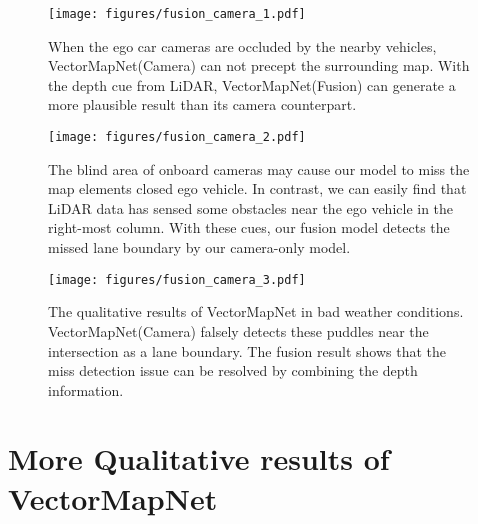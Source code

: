 \documentclass{article}
\theoremstyle{plain}
\theoremstyle{definition}
\theoremstyle{remark}
\begin{document}
\begin{figure}[t]
  \centering
  \texttt{[image: figures/fusion\_camera\_1.pdf]}
  \caption{When the ego car cameras are occluded by the nearby vehicles, VectorMapNet(Camera) can not precept the surrounding map. With the depth cue from LiDAR, VectorMapNet(Fusion) can generate a more plausible result than its camera counterpart.}
  \label{fig:qualitative_Fusion1}
\end{figure}

\begin{figure}[t]
  \centering
  \texttt{[image: figures/fusion\_camera\_2.pdf]}
  \caption{The blind area of onboard cameras may cause our model to miss the map elements closed ego vehicle. In contrast, we can easily find that LiDAR data has sensed some obstacles near the ego vehicle in the right-most column. With these cues, our fusion model detects the missed lane boundary by our camera-only model.}
  \label{fig:qualitative_Fusion2}
\end{figure}

\begin{figure}[t]
  \centering
  \texttt{[image: figures/fusion\_camera\_3.pdf]}
  \caption{The qualitative results of VectorMapNet in bad weather conditions. VectorMapNet(Camera) falsely detects these puddles near the intersection as a lane boundary. The fusion result shows that the miss detection issue can be resolved by combining the depth information.}
  \label{fig:qualitative_Fusion3}
\end{figure}

\section{More Qualitative results of VectorMapNet}
\label{sec:additional_qualitative}
\end{document}
